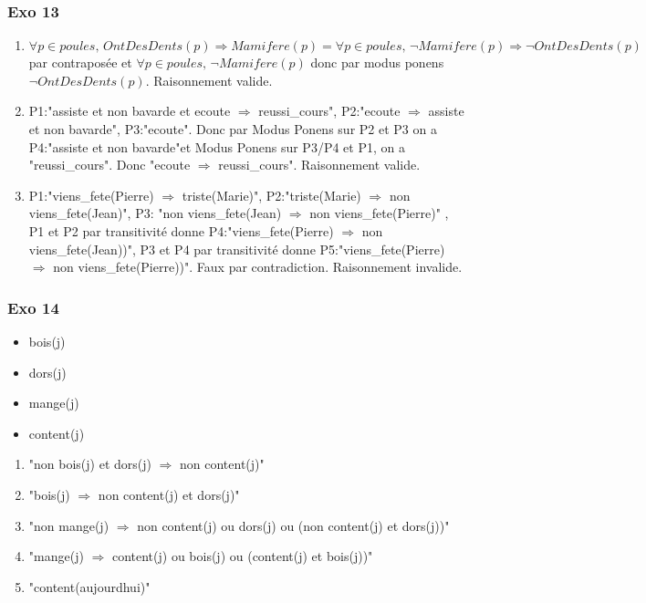 \documentclass[]{book}
\theoremstyle{definition}
\begin{document}
\subsubsection*{Exo 13}
\begin{enumerate}
\item $\forall p \in poules,\, OntDesDents(p) \Rightarrow Mamifere(p) = \forall p \in poules,\, \lnot Mamifere(p) \Rightarrow \lnot OntDesDents(p)$ par contrapos\'ee et $\forall p \in poules,\, \lnot Mamifere(p)$ donc par modus ponens $\lnot OntDesDents(p)$. Raisonnement valide.  
\item P1:"assiste et non bavarde et ecoute $\Rightarrow$ reussi\_cours", P2:"ecoute $\Rightarrow$ assiste et non bavarde", P3:"ecoute". Donc par Modus Ponens sur P2 et P3 on a P4:"assiste et non bavarde"et Modus Ponens sur P3/P4 et P1, on a "reussi\_cours". Donc "ecoute $\Rightarrow$ reussi\_cours". Raisonnement valide.
\item P1:"viens\_fete(Pierre) $\Rightarrow$ triste(Marie)", P2:"triste(Marie) $\Rightarrow$ non viens\_fete(Jean)", P3: "non viens\_fete(Jean) $\Rightarrow$ non viens\_fete(Pierre)" , P1 et P2 par transitivit\'e donne P4:"viens\_fete(Pierre) $\Rightarrow$ non viens\_fete(Jean))", P3 et P4 par transitivit\'e donne P5:"viens\_fete(Pierre) $\Rightarrow$ non viens\_fete(Pierre))". Faux par contradiction. Raisonnement invalide.
\end{enumerate}


\subsubsection*{Exo 14}
\begin{itemize}
\item bois(j)
\item dors(j)
\item mange(j)
\item content(j)
\end{itemize}
\begin{enumerate}[P1:]
\item "non bois(j) et dors(j) $\Rightarrow$ non content(j)"
\item "bois(j) $\Rightarrow$ non content(j) et dors(j)"
\item "non mange(j) $\Rightarrow$ non content(j) ou dors(j) ou (non content(j) et dors(j))"
\item "mange(j) $\Rightarrow$ content(j) ou bois(j) ou (content(j) et bois(j))"
\item "content(aujourdhui)"
\end{enumerate}
\end{document}
